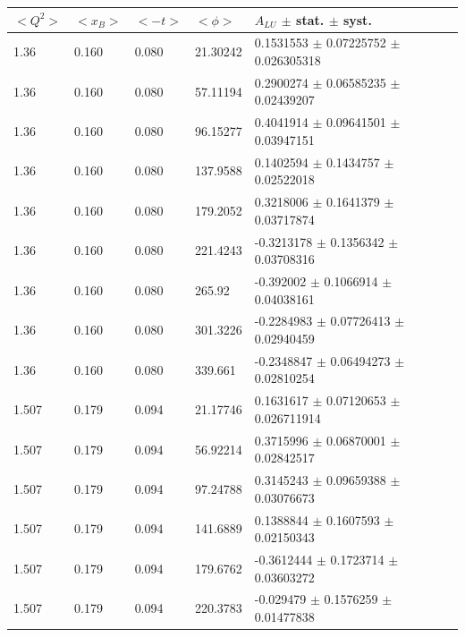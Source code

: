 \begin{table}[!h]
   \begin{center}
      \begin{tabular}{||l|l|l|l|l||}
         \hline
 $<Q^{2}>$ & $<x_{B}>$ & $<-t>$ & $<\phi>$ & $A_{LU}$ $\pm$ stat. $\pm$ syst.\\
         \hline
           1.36 & 0.160 & 0.080 &   21.30242  &  0.1531553   $\pm$  0.07225752   
         $\pm$  0.026305318    \\
           1.36 & 0.160 & 0.080 &   57.11194  &  0.2900274   $\pm$  0.06585235   $\pm$  0.02439207     \\
           1.36 & 0.160 & 0.080 &   96.15277  &  0.4041914   $\pm$  0.09641501   $\pm$  0.03947151     \\
           1.36 & 0.160 & 0.080 &   137.9588  &  0.1402594   $\pm$  0.1434757    $\pm$  0.02522018     \\
           1.36 & 0.160 & 0.080 &   179.2052  &  0.3218006   $\pm$  0.1641379    $\pm$  0.03717874     \\
           1.36 & 0.160 & 0.080 &   221.4243  &  -0.3213178  $\pm$  0.1356342    $\pm$  0.03708316     \\
           1.36 & 0.160 & 0.080 &   265.92    &  -0.392002   $\pm$  0.1066914    $\pm$  0.04038161     \\
           1.36 & 0.160 & 0.080 &   301.3226  &  -0.2284983  $\pm$  0.07726413   $\pm$  0.02940459     \\
           1.36 & 0.160 & 0.080 &   339.661   &  -0.2348847  $\pm$  0.06494273   $\pm$  0.02810254     \\
         \hline                                                                         
           1.507 & 0.179 & 0.094 &  21.17746   & 0.1631617   $\pm$  0.07120653   $\pm$  0.026711914     \\
           1.507 & 0.179 & 0.094 &  56.92214   & 0.3715996   $\pm$  0.06870001   $\pm$  0.02842517      \\
           1.507 & 0.179 & 0.094 &  97.24788   & 0.3145243   $\pm$  0.09659388   $\pm$  0.03076673      \\
           1.507 & 0.179 & 0.094 &  141.6889   & 0.1388844   $\pm$  0.1607593    $\pm$  0.02150343      \\
           1.507 & 0.179 & 0.094 &  179.6762   & -0.3612444  $\pm$  0.1723714    $\pm$  0.03603272      \\
           1.507 & 0.179 & 0.094 &  220.3783   & -0.029479   $\pm$  0.1576259    $\pm$  0.01477838      \\

\end{tabular}
\end{center}
\end{table}
